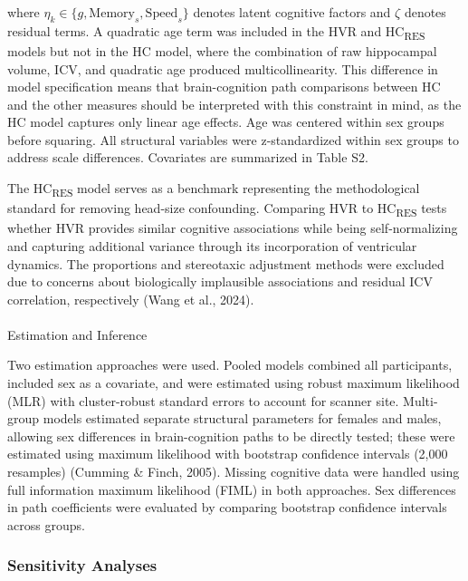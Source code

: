 \documentclass[
]{article}
\makeatletter
\let\oldparagraph\paragraph
\renewcommand{\paragraph}{
    \@ifstar
      \xxxParagraphStar
      \xxxParagraphNoStar
  }
\newcommand{\xxxParagraphStar}[1]{\oldparagraph*{#1}\mbox{}}
\newcommand{\xxxParagraphNoStar}[1]{\oldparagraph{#1}\mbox{}}
\makeatother
\begin{document}
where \(\eta_k \in \{g, \text{Memory}_s, \text{Speed}_s\}\) denotes
latent cognitive factors and \(\zeta\) denotes residual terms. A
quadratic age term was included in the HVR and HC\textsubscript{RES}
models but not in the HC model, where the combination of raw hippocampal
volume, ICV, and quadratic age produced multicollinearity. This
difference in model specification means that brain-cognition path
comparisons between HC and the other measures should be interpreted with
this constraint in mind, as the HC model captures only linear age
effects. Age was centered within sex groups before squaring. All
structural variables were z-standardized within sex groups to address
scale differences. Covariates are summarized in Table S2.

The HC\textsubscript{RES} model serves as a benchmark representing the
methodological standard for removing head-size confounding. Comparing
HVR to HC\textsubscript{RES} tests whether HVR provides similar
cognitive associations while being self-normalizing and capturing
additional variance through its incorporation of ventricular dynamics.
The proportions and stereotaxic adjustment methods were excluded due to
concerns about biologically implausible associations and residual ICV
correlation, respectively (Wang et al., 2024).

\paragraph{Estimation and Inference}\label{estimation-and-inference}

Two estimation approaches were used. Pooled models combined all
participants, included sex as a covariate, and were estimated using
robust maximum likelihood (MLR) with cluster-robust standard errors to
account for scanner site. Multi-group models estimated separate
structural parameters for females and males, allowing sex differences in
brain-cognition paths to be directly tested; these were estimated using
maximum likelihood with bootstrap confidence intervals (2,000 resamples)
(Cumming \& Finch, 2005). Missing cognitive data were handled using full
information maximum likelihood (FIML) in both approaches. Sex
differences in path coefficients were evaluated by comparing bootstrap
confidence intervals across groups.

\subsubsection{Sensitivity Analyses}\label{sensitivity-analyses}
\end{document}
